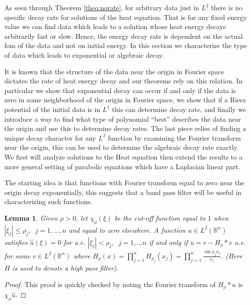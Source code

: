\documentclass{amsart}
\numberwithin{Theorem}{section}
\numberwithin{equation}{section}
\newtheorem {Lemma}[Theorem]  {Lemma}
\theoremstyle{definition}
\theoremstyle{remark}
\begin{document}
As seen through Theorem \ref{theo:norate}, for arbitrary data just
in $L^2$ there is no specific decay rate for solutions of the heat
equation. That is for any fixed energy value we can find data which
leads to a solution whose heat energy decays arbitrarily fast or
slow.  Hence, the energy decay rate is dependent on the actual fom
of the data and not on initial energy.  In this section we
characterize the type of data which leads to exponential or
algebraic decay.

It is known that the structure of the data near the origin in
Fourier space dictates the rate of heat energy decay and our
theorems rely on this relation.  In particular we show that
exponential decay can occur if and only if the data is zero in some
neighborhood of the origin in Fourier space, we show that if a Riesz
potential of the initial data is in $L^1$ this can determine decay
rate, and finally we introduce a way to find what type of polynomial
``best'' describes the data near the origin and use this to
determine decay rates.  The last piece relies of finding a unique
decay character for any $L^2$ function by examining the Fourier
transform near the origin, this can be used to determine the
algebraic decay rate exactly.  We first will analyze solutions to
the Heat equation then extend the results to a more general setting
of parabolic equations which have a Laplacian linear part.

The starting idea is that functions with Fourier transform equal to zero near the origin decay exponentially, this suggests that a band
pass filter will be useful in characterizing such functions.

\begin{Lemma}

Given $\rho>0$, let $\chi_\rho(\xi)$ be the cut-off function equal to $1$ when $|\xi_j|\leq \rho_j, \;\;j=1,...,n$ and equal to zero elsewhere.  A function $u\in L^2(\mathbb{R}^n)$ satisfies $\hat{u}(\xi)=0$ for a.e. $|\xi_j|<\rho_j,\;\;j =1,...n$ if and only if $u = v - H_\rho\ast v$ a.e. for some $v\in L^2(\mathbb{R}^n)$ where $H_\rho(x)= \prod_{j=1}^nH_{\rho_j}(x_j)=\prod_{j=1}^n\frac{\sin{\rho_j x_j}}{x_j}$.  (Here $H$ is used to denote a \emph{high pass} filter).

\end{Lemma}

\begin{proof}

This proof is quickly checked by noting the Fourier transform of $H_{\rho}\ast u$ is $\chi_\rho\hat{u}$.

\end{proof}
\end{document}
